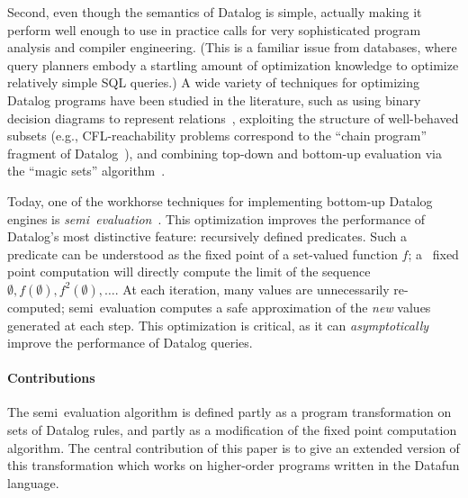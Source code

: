 Second, even though the semantics of Datalog is simple, actually
making it perform well enough to use in practice calls for very
sophisticated program analysis and compiler engineering. (This is a
familiar issue from databases, where query planners embody a startling
amount of optimization knowledge to optimize relatively simple SQL
queries.) A wide variety of techniques for optimizing Datalog programs
have been studied in the literature, such as using binary decision
diagrams to represent relations~\cite{whaley-phd}, exploiting the
structure of well-behaved subsets (e.g., CFL-reachability problems
correspond to the ``chain program'' fragment of
Datalog~\cite{chain-programs}), and combining top-down and bottom-up
evaluation via the ``magic sets'' algorithm~\cite{magic-sets}.

Today, one of the workhorse techniques for implementing bottom-up
Datalog engines is \emph{semi\naive\
  evaluation}~\cite{seminaive}. This optimization improves the
performance of Datalog's most distinctive feature: recursively defined
predicates. Such a predicate can be understood as the fixed point of a
set-valued function $f$; a \naive\ fixed point computation will
directly compute the limit of the sequence
$\emptyset, f(\emptyset), f^2(\emptyset), \dots$. At each iteration,
many values are unnecessarily re-computed; semi\naive\ evaluation
computes a safe approximation of the \emph{new} values generated at
each step. This optimization is critical, as it can
\emph{asymptotically} improve the performance of Datalog queries.


\paragraph{Contributions} The semi\naive\ evaluation algorithm is
defined partly as a program transformation on sets of Datalog rules,
and partly as a modification of the fixed point computation algorithm.
The central contribution of this paper is to give an extended version
of this transformation which works on higher-order programs written
in the Datafun language. 

